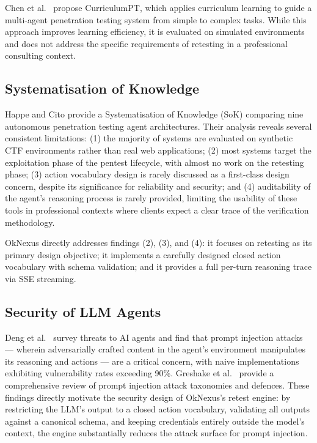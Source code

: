 Chen et al.\ \cite{curriculum_pt2025} propose CurriculumPT, which applies curriculum learning to guide a multi-agent penetration testing system from simple to complex tasks. While this approach improves learning efficiency, it is evaluated on simulated environments and does not address the specific requirements of retesting in a professional consulting context.

\subsection{Systematisation of Knowledge}

Happe and Cito \cite{sok_autonomous_pentest2024} provide a Systematisation of Knowledge (SoK) comparing nine autonomous penetration testing agent architectures. Their analysis reveals several consistent limitations: (1) the majority of systems are evaluated on synthetic CTF environments rather than real web applications; (2) most systems target the exploitation phase of the pentest lifecycle, with almost no work on the retesting phase; (3) action vocabulary design is rarely discussed as a first-class design concern, despite its significance for reliability and security; and (4) auditability of the agent's reasoning process is rarely provided, limiting the usability of these tools in professional contexts where clients expect a clear trace of the verification methodology.

OkNexus directly addresses findings (2), (3), and (4): it focuses on retesting as its primary design objective; it implements a carefully designed closed action vocabulary with schema validation; and it provides a full per-turn reasoning trace via SSE streaming.

\subsection{Security of LLM Agents}

Deng et al.\ \cite{ai_agents_under_threat2024} survey threats to AI agents and find that prompt injection attacks --- wherein adversarially crafted content in the agent's environment manipulates its reasoning and actions --- are a critical concern, with naive implementations exhibiting vulnerability rates exceeding 90\%. Greshake et al.\ \cite{prompt_injection_review2025} provide a comprehensive review of prompt injection attack taxonomies and defences. These findings directly motivate the security design of OkNexus's retest engine: by restricting the LLM's output to a closed action vocabulary, validating all outputs against a canonical schema, and keeping credentials entirely outside the model's context, the engine substantially reduces the attack surface for prompt injection.

